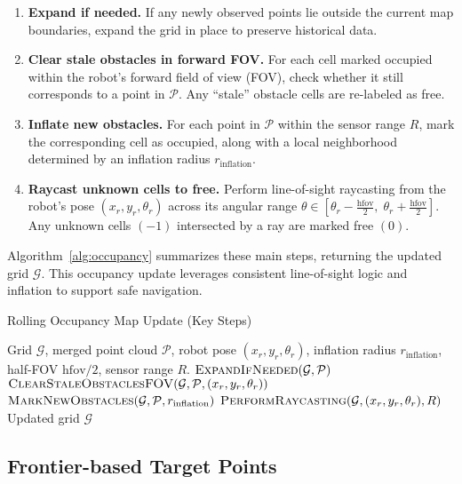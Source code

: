 \begin{enumerate}
    \item \textbf{Expand if needed.} If any newly observed points lie outside the current map boundaries, expand the grid in place to preserve historical data.
    \item \textbf{Clear stale obstacles in forward FOV.} For each cell marked occupied within the robot’s forward field of view (FOV), check whether it still corresponds to a point in \(\mathcal{P}\). Any “stale” obstacle cells are re-labeled as free.
    \item \textbf{Inflate new obstacles.} For each point in \(\mathcal{P}\) within the sensor range \(R\), mark the corresponding cell as occupied, along with a local neighborhood determined by an inflation radius \(r_{\mathrm{inflation}}\).
    \item \textbf{Raycast unknown cells to free.} Perform line-of-sight raycasting from the robot’s pose \((x_r,y_r,\theta_r)\) across its angular range \(\theta \in [\theta_r - \tfrac{\mathrm{hfov}}{2},\;\theta_r + \tfrac{\mathrm{hfov}}{2}]\). Any unknown cells \((-1)\) intersected by a ray are marked free \((0)\).
\end{enumerate}

Algorithm~\ref{alg:occupancy} summarizes these main steps, returning the updated grid \(\mathcal{G}\). This occupancy update leverages consistent line-of-sight logic and inflation to support safe navigation.

\begin{algorithm}[h!]
\caption{Rolling Occupancy Map Update (Key Steps)}
\label{alg:occupancy}
\begin{algorithmic}[1]
\REQUIRE Grid $\mathcal{G}$, merged point cloud $\mathcal{P}$, robot pose $(x_r,y_r,\theta_r)$, inflation radius $r_{\mathrm{inflation}}$, half-FOV $\mathrm{hfov}/2$, sensor range $R$.
\STATE $\textsc{ExpandIfNeeded}(\mathcal{G}, \mathcal{P})$
\STATE $\textsc{ClearStaleObstaclesFOV}(\mathcal{G}, \mathcal{P}, (x_r,y_r,\theta_r))$
\STATE $\textsc{MarkNewObstacles}(\mathcal{G}, \mathcal{P}, r_{\mathrm{inflation}})$
\STATE $\textsc{PerformRaycasting}(\mathcal{G}, (x_r,y_r,\theta_r), R)$
\RETURN Updated grid $\mathcal{G}$
\end{algorithmic}
\end{algorithm}


\subsection{Frontier-based Target Points}

